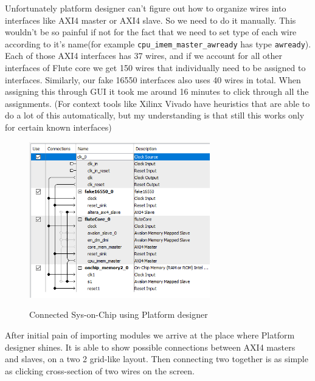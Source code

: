 \documentclass[14pt]{report}
\begin{document}
Unfortunately platform designer can't figure out how to organize wires into interfaces like AXI4 master or AXI4 slave. 
So we need to do it manually. This wouldn't be so painful if not for the fact that we need to set type of each wire according to it's name(for example \verb!cpu_imem_master_awready! has type \verb!awready!). Each of those AXI4 interfaces has 37 wires, and if we account for all other interfaces of Flute core we get 150 wires that individually need to be assigned to interfaces. Similarly, our fake 16550 interfaces also uses 40 wires in total. When assigning this through GUI it took me around 16 minutes to click through all the assignments. (For context tools like Xilinx Vivado have heuristics that are able to do a lot of this automatically, but my understanding is that still this works only for certain known interfaces)
\\
\begin{figure}
    \caption{Connected Sys-on-Chip using Platform designer}
    \includegraphics[width=0.7\textwidth]{images/Example2QSys.png} \\
    \centering
\end{figure}
After initial pain of importing modules we arrive at the place where Platform designer shines. It is able to show possible connections between AXI4 masters and slaves, on a two 2 grid-like layout. Then connecting two together is as simple as clicking cross-section of two wires on the screen.  
\end{document}
